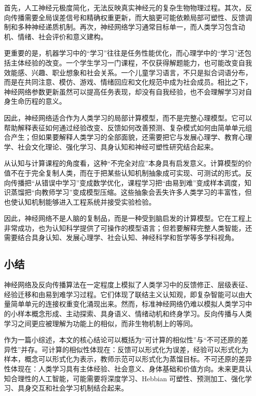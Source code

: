 \documentclass[UTF8,zihao=-4,a4paper]{ctexart}
\begin{document}
首先，人工神经元极度简化，无法反映真实神经元的复杂生物物理过程。其次，反向传播需要全局误差信号和精确权重更新，而大脑更可能依赖局部可塑性、反馈调制和多种神经递质机制。再次，神经网络学习通常目标单一，而人类学习包含动机、情绪、社会评价和意义建构。

更重要的是，机器学习中的“学习”往往是任务性能优化，而心理学中的“学习”还包括主体经验的改变。一个学生学习一门课程，不仅获得解题能力，也可能改变自我效能感、兴趣、职业想象和社会关系。一个儿童学习语言，不只是拟合词语分布，而是在共同注意、模仿、游戏、情绪回应和文化规范中成为社会成员。相比之下，神经网络参数更新虽然可以提高任务表现，却没有自我经验，也不会理解学习对自身生命历程的意义。

因此，神经网络适合作为人类学习的局部计算模型，而不是完整心理模型。它可以帮助解释表征如何通过经验改变、反馈如何改善预测、复杂模式如何由简单单元组合产生；但如果要解释人类学习的全部面貌，还需要把它与发展心理学、教育心理学、社会文化理论、强化学习、具身认知和神经可塑性研究结合起来。

从认知与计算课程的角度看，这种“不完全对应”本身具有启发意义。计算模型的价值不在于完全复制人类，而在于把某些认知机制抽象成可实现、可测试的形式。反向传播把“从错误中学习”变成数学优化，课程学习把“由易到难”变成样本调度，知识蒸馏把“向教师学习”变成模型压缩。这些抽象会丢失许多人类学习的丰富性，但也使认知机制能够进入工程系统并接受实验检验。

因此，神经网络不是人脑的复制品，而是一种受到脑启发的计算模型。它在工程上非常成功，也为认知科学提供了可操作的模型语言；但若要解释完整人类智能，还需要结合具身认知、发展心理学、社会认知、神经科学和哲学等多学科视角。

\subsection{小结}

神经网络及反向传播算法在一定程度上模拟了人类学习中的反馈修正、层级表征、经验迁移和由易到难学习过程。它们体现了联结主义认知观，即复杂智能可以由大量简单单元的连接权重变化涌现出来。然而，标准神经网络仍难以模拟人类学习中的小样本概念形成、主动探索、具身语义、情绪动机和终身学习。反向传播与人类学习之间更应被理解为功能上的相似，而非生物机制上的等同。

作为一篇小综述，本文的核心结论可以概括为“可计算的相似性”与“不可还原的差异性”并存。可计算的相似性体现在：反馈可以形式化为误差，经验可以形式化为样本，概念可以形式化为表示，教师示范可以形式化为蒸馏目标。不可还原的差异性体现在：人类学习具有主体经验、社会意义、身体基础和价值方向。未来更具认知合理性的人工智能，可能需要将深度学习、Hebbian 可塑性、预测加工、强化学习、具身交互和社会学习机制结合起来。
\end{document}
